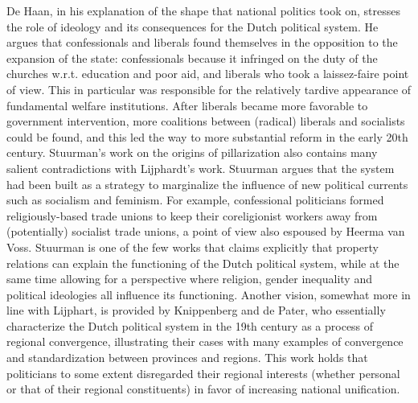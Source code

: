     De Haan, in his explanation of the shape that national politics took on, stresses the role of ideology and its consequences for the Dutch political system.\autocite[p. 194]{de2003het} He argues that confessionals and liberals found themselves in the opposition to the expansion of the state: confessionals because it infringed on the duty of the churches w.r.t. education and poor aid, and liberals who took a laissez-faire point of view. This in particular was responsible for the relatively tardive appearance of fundamental welfare institutions. After liberals became more favorable to government intervention, more coalitions between (radical) liberals and socialists could be found, and this led the way to more substantial reform in the early 20th century. Stuurman’s work on the origins of pillarization also contains many salient contradictions with Lijphardt’s work.\autocite{stuurman1983verzuiling} Stuurman argues that the system had been built as a strategy to marginalize the influence of new political currents such as socialism and feminism.  For example, confessional politicians formed religiously-based trade unions to keep their coreligionist workers away from (potentially) socialist trade unions, a point of view also espoused by Heerma van Voss.\autocite{heerma2000rode} Stuurman is one of the few works that claims explicitly that property relations can explain the functioning of the Dutch political system, while at the same time allowing for a perspective where religion, gender inequality and political ideologies all influence its functioning.\autocite[p.335]{stuurman1983verzuiling} Another vision, somewhat more in line with Lijphart, is provided by Knippenberg and de Pater, who essentially characterize the Dutch political system in the 19th century as a process of regional convergence, illustrating their cases with many examples of convergence and standardization between provinces and regions.\autocite{knippenberg2000eenwording}  This work holds that politicians to some extent disregarded their regional interests (whether personal or that of their regional constituents) in favor of increasing national unification. 

